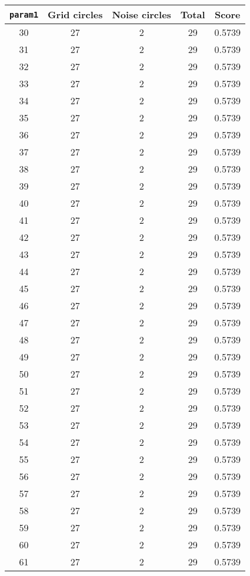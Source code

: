 \documentclass[letterpaper, 12pt]{article}
\begin{document}
\begin{longtable}{|c|c|c|c|c|}
\hline
\textbf{\texttt{param1}} & \textbf{Grid circles} & \textbf{Noise circles} & \textbf{Total} & \textbf{Score} \\
\hline
30 & 27 & 2 & 29 & 0.5739 \\
\hline
31 & 27 & 2 & 29 & 0.5739 \\
\hline
32 & 27 & 2 & 29 & 0.5739 \\
\hline
33 & 27 & 2 & 29 & 0.5739 \\
\hline
34 & 27 & 2 & 29 & 0.5739 \\
\hline
35 & 27 & 2 & 29 & 0.5739 \\
\hline
36 & 27 & 2 & 29 & 0.5739 \\
\hline
37 & 27 & 2 & 29 & 0.5739 \\
\hline
38 & 27 & 2 & 29 & 0.5739 \\
\hline
39 & 27 & 2 & 29 & 0.5739 \\
\hline
40 & 27 & 2 & 29 & 0.5739 \\
\hline
41 & 27 & 2 & 29 & 0.5739 \\
\hline
42 & 27 & 2 & 29 & 0.5739 \\
\hline
43 & 27 & 2 & 29 & 0.5739 \\
\hline
44 & 27 & 2 & 29 & 0.5739 \\
\hline
45 & 27 & 2 & 29 & 0.5739 \\
\hline
46 & 27 & 2 & 29 & 0.5739 \\
\hline
47 & 27 & 2 & 29 & 0.5739 \\
\hline
48 & 27 & 2 & 29 & 0.5739 \\
\hline
49 & 27 & 2 & 29 & 0.5739 \\
\hline
50 & 27 & 2 & 29 & 0.5739 \\
\hline
51 & 27 & 2 & 29 & 0.5739 \\
\hline
52 & 27 & 2 & 29 & 0.5739 \\
\hline
53 & 27 & 2 & 29 & 0.5739 \\
\hline
54 & 27 & 2 & 29 & 0.5739 \\
\hline
55 & 27 & 2 & 29 & 0.5739 \\
\hline
56 & 27 & 2 & 29 & 0.5739 \\
\hline
57 & 27 & 2 & 29 & 0.5739 \\
\hline
58 & 27 & 2 & 29 & 0.5739 \\
\hline
59 & 27 & 2 & 29 & 0.5739 \\
\hline
60 & 27 & 2 & 29 & 0.5739 \\
\hline
61 & 27 & 2 & 29 & 0.5739 \\

\end{longtable}
\end{document}
